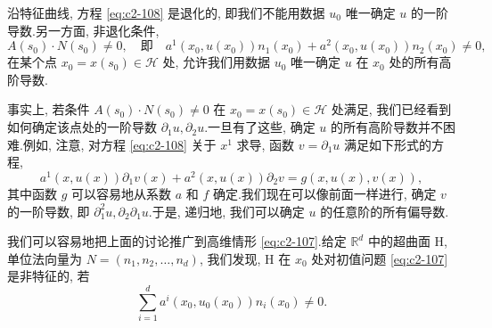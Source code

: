 沿特征曲线, 方程 \eqref{eq:c2-108} 是退化的, 即我们不能用数据 $u_{0}$ 唯一确定 $u$ 的一阶导数.另一方面, 非退化条件,
\begin{equation}
A(s_{0}) \cdot N(s_{0}) \neq 0, \quad \text{即} \quad a^{1}(x_{0}, u(x_{0})) n_{1}(x_{0}) + a^{2}(x_{0}, u(x_{0})) n_{2}(x_{0}) \neq 0, \label{eq:c2-112}
\end{equation}
在某个点 $x_{0} = x(s_{0}) \in \mathcal{H}$ 处, 允许我们用数据 $u_{0}$ 唯一确定 $u$ 在 $x_{0}$ 处的所有高阶导数.

事实上, 若条件 $A(s_{0}) \cdot N(s_{0}) \neq 0$ 在 $x_{0} = x(s_{0}) \in \mathcal{H}$ 处满足, 我们已经看到如何确定该点处的一阶导数 $\partial_{1} u, \partial_{2} u$.一旦有了这些, 确定 $u$ 的所有高阶导数并不困难.例如, 注意, 对方程 \eqref{eq:c2-108} 关于 $x^{1}$ 求导, 函数 $v = \partial_{1} u$ 满足如下形式的方程,
\[
a^{1}(x, u(x)) \partial_{1} v(x) + a^{2}(x, u(x)) \partial_{2} v = g(x, u(x), v(x)),
\]
其中函数 $g$ 可以容易地从系数 $a$ 和 $f$ 确定.我们现在可以像前面一样进行, 确定 $v$ 的一阶导数, 即 $\partial_{1}^{2} u, \partial_{2} \partial_{1} u$.于是, 递归地, 我们可以确定 $u$ 的任意阶的所有偏导数.

我们可以容易地把上面的讨论推广到高维情形 \eqref{eq:c2-107}.给定 $\mathbb{R}^{d}$ 中的超曲面 H, 单位法向量为 $N = (n_{1}, n_{2}, \ldots, n_{d})$, 我们发现, H 在 $x_{0}$ 处对初值问题 \eqref{eq:c2-107} 是非特征的, 若
\begin{equation}
\sum_{i = 1}^{d} a^{i}(x_{0}, u_{0}(x_{0})) n_{i}(x_{0}) \neq 0. \label{eq:c2-113}
\end{equation}

